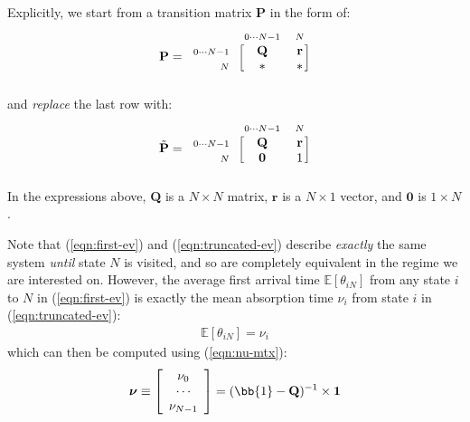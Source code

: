 \documentclass[../template.tex]{subfiles}
\begin{document}
\medskip

Explicitly, we start from a transition matrix \textbf{P} in the form of:
\begin{align} \label{eqn:first-ev}
    \textbf{P} = \begin{blockarray}{l*{2}{c}}
        \begin{block}{l*{2}{>{\scriptstyle}c<{}}}
            & 0\cdots N-1 & N \\
        \end{block}
        \begin{block}{>{\scriptstyle}r<{}[*{2}{c}]}
            0\cdots N-1 & \textbf{Q}  & \textbf{r} \\
            N & * & *  \\
        \end{block}
    \end{blockarray}
\end{align}
and \textit{replace} the last row with:
\begin{align}
    \tilde{\textbf{P}} = \begin{blockarray}{l*{2}{c}}
        \begin{block}{l*{2}{>{\scriptstyle}c<{}}}
            & 0\cdots N-1 & N \\
        \end{block}
        \begin{block}{>{\scriptstyle}r<{}[*{2}{c}]}
            0\cdots N-1 & \textbf{Q}  & \textbf{r} \\
            N & \textbf{0}  & 1  \\
        \end{block}
    \end{blockarray}
    \label{eqn:truncated-ev}
\end{align} 
In the expressions above, \textbf{Q} is a $N\times N$ matrix, $\bm{r}$ is a $N\times 1$ vector, and $\bm{0}$ is $1\times N$.

\medskip

Note that (\ref{eqn:first-ev}) and (\ref{eqn:truncated-ev}) describe \textit{exactly} the same system \textit{until} state $N$ is visited, and so are completely equivalent in the regime we are interested on. However, the average first arrival time $\mathbb{E}[\theta_{iN}]$ from any state $i$ to $N$ in (\ref{eqn:first-ev}) is exactly the mean absorption time $\nu_i$ from state $i$ in (\ref{eqn:truncated-ev}):
\begin{align*}
    \mathbb{E}[\theta_{iN}] = \nu_i
\end{align*}
which can then be computed using (\ref{eqn:nu-mtx}):
\begin{align*}
    \bm{\nu} \equiv \left[\begin{array}{c}
    \nu_0 \\ 
    \cdots \\ 
    \nu_{N-1}
    \end{array}\right] = (\bb{1} - \textbf{Q})^{-1} \times \textbf{1} 
\end{align*}
\end{document}

